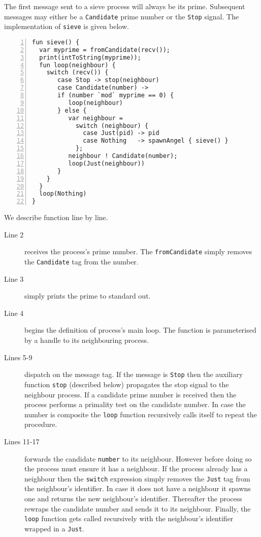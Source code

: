 \documentclass[12pt,mscres,cdtppar,twoside,openright,logo,rightchapter,normalheadings]{infthesis}
\theoremstyle{definition}
\begin{document}
The first message sent to a sieve process will always be its
prime. Subsequent messages may either be a \lstinline$Candidate$ prime
number or the \lstinline$Stop$ signal. The implementation of
\lstinline$sieve$ is given below.
%
\begin{lstlisting}[numbers=left]
fun sieve() {
  var myprime = fromCandidate(recv());
  print(intToString(myprime));
  fun loop(neighbour) {
    switch (recv()) {
       case Stop -> stop(neighbour)
       case Candidate(number) ->
       if (number `mod` myprime == 0) {
          loop(neighbour)
       } else {
          var neighbour =
            switch (neighbour) {
              case Just(pid) -> pid
              case Nothing   -> spawnAngel { sieve() }
            };
          neighbour ! Candidate(number);
          loop(Just(neighbour))
       }
    }
  }
  loop(Nothing)
}
\end{lstlisting}
%
We describe function line by line.
\begin{description}
\item[Line 2] receives the process's prime number. The
  \lstinline$fromCandidate$ simply removes the \lstinline$Candidate$
  tag from the number.
\item[Line 3] simply prints the prime to standard out.
\item[Line 4] begins the definition of process's main loop. The
  function is parameterised by a handle to its neighbouring process.
\item[Lines 5-9] dispatch on the message tag. If the message is
  \lstinline$Stop$ then the auxiliary function \lstinline$stop$
  (described below) propagates the stop signal to the neighbour
  process. If a candidate prime number is received then the process
  performs a primality test on the candidate number. In case the
  number is composite the \lstinline$loop$ function recursively calls
  itself to repeat the procedure.
\item[Lines 11-17] forwards the candidate \lstinline$number$ to its
  neighbour. However before doing so the process must ensure it has a
  neighbour. If the process already has a neighbour then the
  \lstinline$switch$ expression simply removes the \lstinline$Just$
  tag from the neighbour's identifier. In case it does not have a
  neighbour it spawns one and returns the new neighbour's identifier.
  Thereafter the process rewraps the candidate number and sends it to
  its neighbour. Finally, the \lstinline$loop$ function gets called
  recursively with the neighbour's identifier wrapped in a
  \lstinline$Just$.
\end{description}
\end{document}
